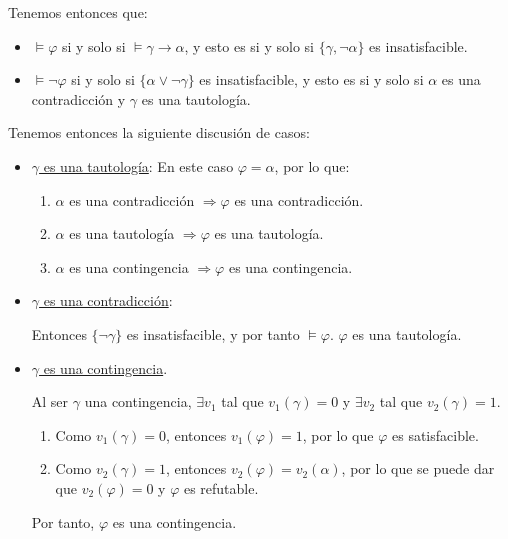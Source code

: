 \begin{ejercicio}
    Tenemos entonces que:
    \begin{itemize}
        \item $\vDash \varphi$ si y solo si $\vDash \gamma\rightarrow \alpha$, y esto es si y solo si $\{\gamma,\lnot \alpha\}$ es insatisfacible.
        \item $\vDash \lnot \varphi$ si y solo si $\{\alpha\lor \lnot \gamma\}$ es insatisfacible,
        y esto es si y solo si $\alpha$ es una contradicción y $\gamma$ es una tautología.
    \end{itemize}

    Tenemos entonces la siguiente discusión de casos:
    \begin{itemize}
        \item \ul{$\gamma$ es una tautología}: En este caso $\varphi=\alpha$, por lo que:
        \begin{enumerate}
            \item $\alpha$ es una contradicción $\Longrightarrow \varphi$ es una contradicción.
            \item $\alpha$ es una tautología $\Longrightarrow \varphi$ es una tautología.
            \item $\alpha$ es una contingencia $\Longrightarrow \varphi$ es una contingencia.
        \end{enumerate}
        \item \ul{$\gamma$ es una contradicción}:
        
        Entonces $\{\lnot \gamma\}$ es insatisfacible, y por tanto $\vDash \varphi$. $\varphi$ es una tautología.

        \item \ul{$\gamma$ es una contingencia}. 
        
        Al ser $\gamma$ una contingencia, $\exists v_1$ tal que $v_1(\gamma)=0$ y $\exists v_2$ tal que $v_2(\gamma)=1$.
        \begin{enumerate}
            \item Como $v_1(\gamma)=0$, entonces $v_1(\varphi)=1$, por lo que $\varphi$ es satisfacible.
            \item Como $v_2(\gamma)=1$, entonces $v_2(\varphi)=v_2(\alpha)$, por lo que se puede dar que $v_2(\varphi)=0$ y $\varphi$ es refutable.
        \end{enumerate}

        Por tanto, $\varphi$ es una contingencia.
    \end{itemize}
\end{ejercicio}

